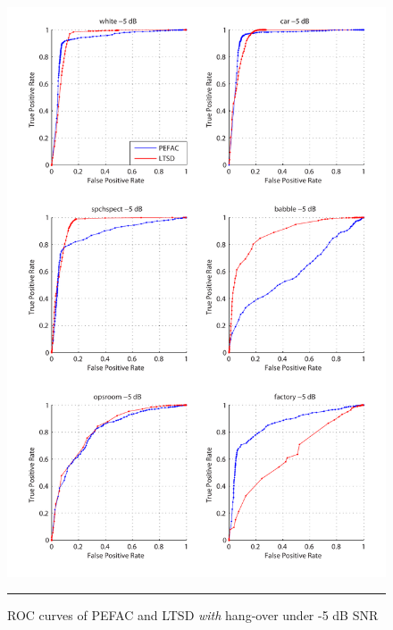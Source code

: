 \begin{figure}[htbp]
	\centering
		\includegraphics[width=1.0\columnwidth]{Figures/Chapter5/pefacm5.pdf}
		\rule{37em}{0.5pt}
	\caption[ROC curves of PEFAC and LTSD \emph{with} hang-over under -5 dB SNR]{ROC curves of PEFAC and LTSD \emph{with} hang-over under -5 dB SNR}
	\label{fig:pefacm5}
\end{figure}

